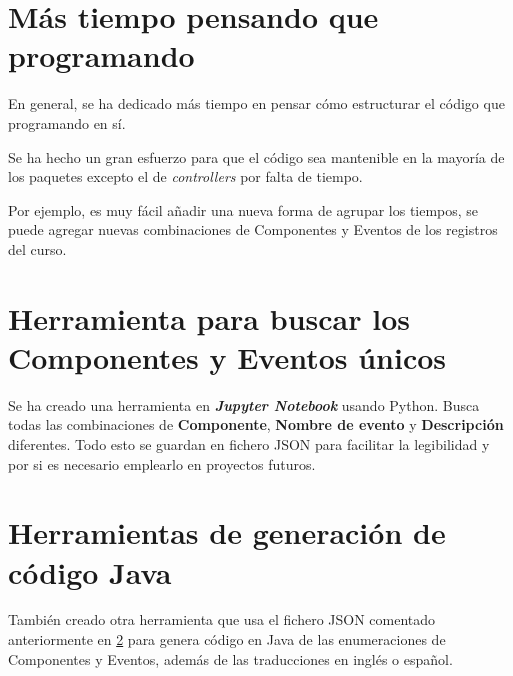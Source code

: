 \section{Más tiempo pensando que programando}

En general, se ha dedicado más tiempo en pensar cómo estructurar el código que programando en sí. 

Se ha hecho un gran esfuerzo para que el código sea mantenible en la mayoría de los paquetes excepto el de \textit{controllers} por falta de tiempo.

Por ejemplo, es muy fácil añadir una nueva forma de agrupar los tiempos,
se puede agregar nuevas combinaciones de Componentes y Eventos de los registros del curso.

\section{Herramienta para buscar los Componentes y Eventos únicos}\label{sec:componeteyevento}

Se ha creado una herramienta en \textbf{\textit{Jupyter Notebook}} usando Python. Busca todas las combinaciones de \textbf{Componente}, \textbf{Nombre de evento} y \textbf{Descripción} diferentes. Todo esto se guardan en fichero JSON para facilitar la legibilidad y por si es necesario emplearlo en proyectos futuros.


\section{Herramientas de generación de código Java}

También creado otra herramienta que usa el fichero JSON comentado anteriormente en \ref{sec:componeteyevento} para genera código en Java de las enumeraciones de Componentes y Eventos, además de las traducciones en inglés o español.
